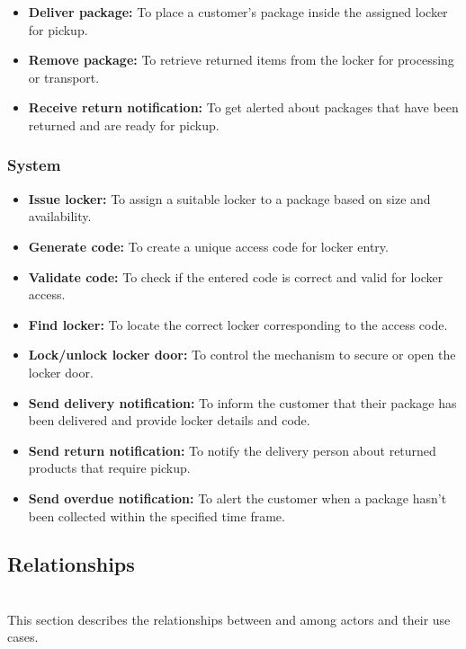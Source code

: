 \begin{itemize}
\item
\textbf{Deliver package:} To place a customer's package inside the assigned locker for pickup.
\item
\textbf{Remove package:} To retrieve returned items from the locker for processing or transport.
\item
\protect{}\label{cw3s-91-jiBSlpGeXs-UQ}
\textbf{Receive return notification:} To get alerted about packages that have been returned and are ready for pickup.
\end{itemize}

\subsubsection{System}\label{Rm9pWE5U_qFi4rWgMbNj5}

\begin{itemize}
\item
\textbf{Issue locker:} To assign a suitable locker to a package based on size and availability.
\item
\textbf{Generate code:} To create a unique access code for locker entry.
\item
\textbf{Validate code:} To check if the entered code is correct and valid for locker access.
\item
\textbf{Find locker:} To locate the correct locker corresponding to the access code.
\item
\textbf{Lock/unlock locker door:} To control the mechanism to secure or open the locker door.
\item
\textbf{Send delivery notification:} To inform the customer that their package has been delivered and provide locker details and code.
\item
\textbf{Send return notification:} To notify the delivery person about returned products that require pickup.
\item
\protect{}\label{VeaWCJjXOTZR19XJcx-jB}
\textbf{Send overdue notification:} To alert the customer when a package hasn't been collected within the specified time frame.
\end{itemize}

\subsection{Relationships}\label{15sE70CpzILojoobSA_Zu}
\\
This section describes the relationships between and among actors and their use cases.

